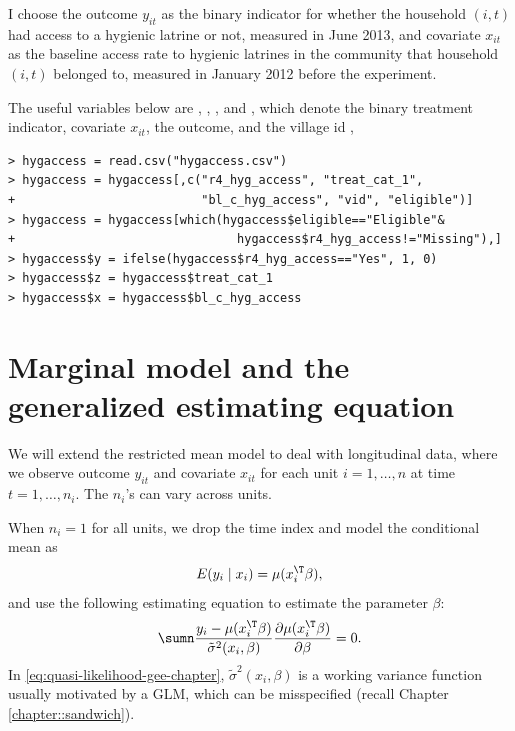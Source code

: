 I choose the outcome $y_{it}$ as the binary indicator for whether the household $(i,t)$ had access to a hygienic latrine or not, measured in June 2013, and covariate $x_{it}$ as the baseline access rate to hygienic latrines in the community that household $(i,t)$ belonged to, measured in January 2012 before the experiment.

The useful variables below are , , , and , which denote the binary treatment indicator, covariate $x_{it}$, the outcome, and the village id , 
\begin{lstlisting}
> hygaccess = read.csv("hygaccess.csv")
> hygaccess = hygaccess[,c("r4_hyg_access", "treat_cat_1", 
+                          "bl_c_hyg_access", "vid", "eligible")]
> hygaccess = hygaccess[which(hygaccess$eligible=="Eligible"&
+                               hygaccess$r4_hyg_access!="Missing"),]
> hygaccess$y = ifelse(hygaccess$r4_hyg_access=="Yes", 1, 0)
> hygaccess$z = hygaccess$treat_cat_1
> hygaccess$x = hygaccess$bl_c_hyg_access
\end{lstlisting}



\section{Marginal model and the generalized estimating equation}

We will extend the restricted mean model to deal with longitudinal
data, where we observe outcome $y_{it}$ and covariate $x_{it}$ for
each unit $i=1,\ldots,n$ at time $t=1,\ldots,n_{i}.$ The $n_i$'s can vary across units. 

When $n_{i}=1$
for all units, we drop the time index and model the conditional mean
as 
\[
E(y_{i}\mid x_{i})=\mu(x_{i}^{\T}\beta),
\]
and use the following estimating equation  
to estimate the parameter $\beta$:
\begin{equation}
\sumn\frac{y_{i}-\mu(x_{i}^{\T}\beta)}{\tilde{\sigma}^{2}(x_{i}, \beta)}\frac{\partial\mu(x_{i}^{\T}\beta)}{\partial\beta}=0 . \label{eq:quasi-likelihood-gee-chapter}
\end{equation}
In \eqref{eq:quasi-likelihood-gee-chapter},  $\tilde{\sigma}^{2}(x_{i}, \beta)$ is a working variance function usually motivated by a GLM, which can be misspecified (recall Chapter \ref{chapter::sandwich}). 


